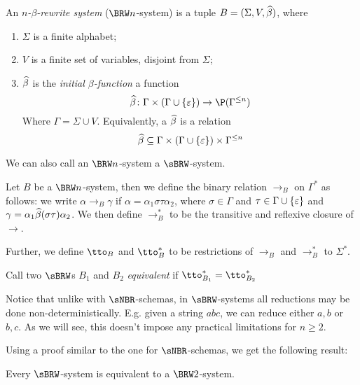 \documentclass{llncs}
\begin{document}
\begin{definition}

    An \emph{$n$-$\beta$-rewrite system} ($\BRW n$-system) is a tuple $B=(\Sigma,V,\widehat\beta)$, where
    \begin{enumerate}
        \item $\Sigma$ is a finite alphabet;
        \item $V$ is a finite set of variables, disjoint from $\Sigma$;
        \item $\widehat\beta$ is the \emph{initial $\beta$-function} a function
        $$ \hb\colon \Gamma\times(\Gamma\cup\set\epsilon)\to\P(\Gamma^{\leq n}) $$
        Where $\Gamma=\Sigma\cup V$.
        Equivalently, a $\widehat\beta$ is a relation
        $$ \hb \subseteq \Gamma\times(\Gamma\cup\set\epsilon)\times\Gamma^{\leq n} $$
    \end{enumerate}
    We can also call an $\BRW n$-system a $\sBRW$-system.

\end{definition}

\begin{definition}

    Let $B$ be a $\BRW n$-system, then we define the binary relation $\to_B$ on $\Gamma^*$ as follows: we write
    $\alpha\to_B\gamma$ if $\alpha=\alpha_1\sigma\tau\alpha_2$, where $\sigma\in\Gamma$ and $\tau\in\Gamma\cup\set\epsilon$ and
    $\gamma=\alpha_1\widehat\beta(\sigma\tau)\alpha_2$.
    We then define $\to_B^*$ to be the transitive and reflexive closure of $\to$.

    Further, we define $\tto_B$ and $\tto^*_B$ to be restrictions of $\to_B$ and $\to^*_B$ to $\Sigma^*$.

    Call two $\sBRW$s $B_1$ and $B_2$ \emph{equivalent} if ${\tto_{B_1}^*}={\tto_{B_2}^*}$

\end{definition}

Notice that unlike with $\sNBR$-schemas, in $\sBRW$-systems all reductions may be done non-deterministically.
E.g. given a string $abc$, we can reduce either $a,b$ or $b,c$.
As we will see, this doesn't impose any practical limitations for $n\geq2$.

Using a proof similar to the one for $\sNBR$-schemas, we get the following result:

\begin{lemma}

    Every $\sBRW$-system is equivalent to a $\BRW2$-system.

\end{lemma}
\end{document}
